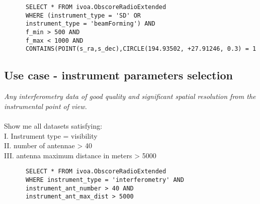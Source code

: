 \begin{verbatim}
      SELECT * FROM ivoa.ObscoreRadioExtended
      WHERE (instrument_type = 'SD' OR
      instrument_type = 'beamForming') AND
      f_min > 500 AND
      f_max < 1000 AND
      CONTAINS(POINT(s_ra,s_dec),CIRCLE(194.93502, +27.91246, 0.3) = 1     
\end{verbatim}




\subsection{Use case - instrument parameters selection }
\textit{Any interferometry data of good quality and significant spatial resolution from the instrumental point of view. }\\ \\
Show me all datasets satisfying:\\
I. Instrument type = visibility \\
II. number of antennae > 40 \\
III. antenna maximum distance in meters  > 5000 \\

\begin{verbatim}
      SELECT * FROM ivoa.ObscoreRadioExtended
      WHERE instrument_type = 'interferometry' AND
      instrument_ant_number > 40 AND
      instrument_ant_max_dist > 5000 
\end{verbatim}



